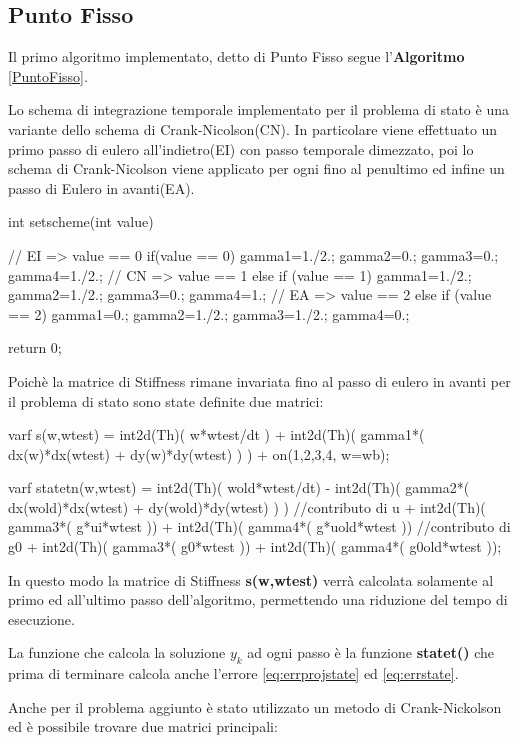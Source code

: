 \subsection{Punto Fisso}
Il primo algoritmo implementato, detto di Punto Fisso segue l'\textbf{Algoritmo} \ref{PuntoFisso}.
\par
Lo schema di integrazione temporale implementato per il problema di stato è una variante dello schema di Crank-Nicolson(CN). In particolare viene effettuato un primo passo di eulero all'indietro(EI) con passo temporale dimezzato, poi lo schema di Crank-Nicolson viene applicato per ogni fino al penultimo ed infine un passo di Eulero in avanti(EA).
\begin{Code}[caption={Funzione \texttt{setscheme()}}]
int setscheme(int value)
{
	// EI => value == 0
	if(value == 0)
	{
	    gamma1=1./2.;
	    gamma2=0.;
	    gamma3=0.;
	    gamma4=1./2.;
	}
	// CN => value == 1
	else if (value == 1)
	{	
		gamma1=1./2.;
	    gamma2=1./2.;
	    gamma3=0.;
	    gamma4=1.;
	}
	// EA => value == 2
	else if (value == 2)
	{
		gamma1=0.;
	    gamma2=1./2.;
	    gamma3=1./2.;
	    gamma4=0.;
	}
	
	return 0;
}
\end{Code}
Poichè la matrice di Stiffness rimane invariata fino al passo di eulero in avanti per il problema di stato sono state definite due matrici:
\begin{Code}[caption={Matrici \texttt{s(w,wtest)} e \texttt{statetn(w,wtest)}}]
varf s(w,wtest) =   int2d(Th)( w*wtest/dt )
	        	  + int2d(Th)( gamma1*( dx(w)*dx(wtest) + dy(w)*dy(wtest) ) )
				  + on(1,2,3,4, w=wb);

varf statetn(w,wtest) =   int2d(Th)( wold*wtest/dt)
				  		- int2d(Th)( gamma2*(   dx(wold)*dx(wtest) 
				  							 + dy(wold)*dy(wtest) ) )
							//contributo di u
						+ int2d(Th)( gamma3*( g*ui*wtest ))
				 		+ int2d(Th)( gamma4*( g*uold*wtest ))
							//contributo di g0
						+ int2d(Th)( gamma3*( g0*wtest ))
				 		+ int2d(Th)( gamma4*( g0old*wtest ));
\end{Code}
In questo modo la matrice di Stiffness \textbf{s(w,wtest)} verrà calcolata solamente al primo ed all'ultimo passo dell'algoritmo, permettendo una riduzione del tempo di esecuzione.
\par
La funzione che calcola la soluzione $y_k$ ad ogni passo è la funzione \textbf{statet()} che prima di terminare calcola anche l'errore \eqref{eq:errprojstate} ed \eqref{eq:errstate}.
\par
Anche per il problema aggiunto è stato utilizzato un metodo di Crank-Nickolson ed è possibile trovare due matrici principali:
